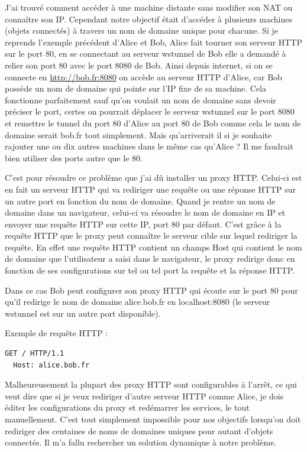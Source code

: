J'ai trouvé comment accéder à une machine distante sans modifier son
NAT ou connaître son IP. Cependant notre objectif était d'accéder à
plusieurs machines (objets connectés) à travers un nom de domaine
unique pour chacune. Si je reprends l'exemple précédent d'Alice et
Bob, Alice fait tourner son serveur HTTP sur le port 80, en se
connectant au serveur wstunnel de Bob elle a demandé à relier son port
80 avec le port 8080 de Bob. Ainsi depuis internet, si on se connecte
en \url{http://bob.fr:8080} on accède au serveur HTTP d'Alice, car Bob
possède un nom de domaine qui pointe sur l'IP fixe de sa machine. Cela
fonctionne parfaitement sauf qu'on voulait un nom de domaine sans
devoir préciser le port, certes on pourrait déplacer le serveur
wstunnel sur le port 8080 et remettre le tunnel du port 80 d'Alice au
port 80 de Bob comme cela le nom de domaine serait bob.fr tout
simplement. Mais qu'arriverait il si je souhaite rajouter une ou dix
autres machines dans le même cas qu'Alice ? Il me faudrait bien
utiliser des ports autre que le 80.

C'est pour résoudre ce problème que j'ai dû installer un proxy
HTTP. Celui-ci est en fait un serveur HTTP qui va rediriger une
requête ou une réponse HTTP sur un autre port en fonction du nom de
domaine. Quand je rentre un nom de domaine dans un navigateur,
celui-ci va résoudre le nom de domaine en IP et envoyer une requête
HTTP sur cette IP, port 80 par défaut. C'est grâce à la requête HTTP
que le proxy peut connaître le serveur cible sur lequel rediriger la
requête. En effet une requête HTTP contient un champs \og Host \fg{}
qui contient le nom de domaine que l'utilisateur a saisi dans le
navigateur, le proxy redirige donc en fonction de ses configurations
sur tel ou tel port la requête et la réponse HTTP.

Dans ce cas Bob peut configurer son proxy HTTP qui écoute sur le port
80 pour qu'il redirige le nom de domaine \og alice.bob.fr \fg{} en \og
localhost:8080 \fg{} (le serveur wstunnel est sur un autre port
disponible).

Exemple de requête HTTP :
\begin{lstlisting}[language=bash]
  GET / HTTP/1.1
  Host: alice.bob.fr
\end{lstlisting}

Malheureusement la plupart des proxy HTTP sont configurables à
l'arrêt, ce qui veut dire que si je veux rediriger d'autre serveur
HTTP comme Alice, je dois éditer les configurations du proxy et
redémarrer les services, le tout manuellement. C'est tout simplement
impossible pour nos objectifs lorsqu'on doit rediriger des centaines
de noms de domaines uniques pour autant d'objets connectés. Il m'a
fallu rechercher un solution dynamique à notre problème.

